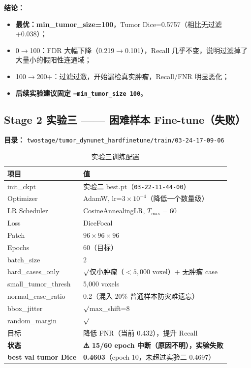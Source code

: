\documentclass{article}
\begin{document}
	\noindent\textbf{结论：}
	\begin{itemize}
		\item \textbf{最优：min\_tumor\_size=100}，Tumor Dice=0.5757（相比无过滤 +0.038）；
		\item 0$\to$100：FDR 大幅下降（0.219$\to$0.101），Recall 几乎不变，说明过滤掉了大量小的假阳性连通域；
		\item 100$\to$200+：过滤过激，开始漏检真实肿瘤，Recall/FNR 明显恶化；
		\item \textbf{后续实验建议固定 \texttt{--min\_tumor\_size 100}}。
	\end{itemize}

	\subsection{Stage 2 实验三 —— 困难样本 Fine-tune（失败）}

	\noindent\textbf{目录：} \texttt{twostage/tumor\_dynunet\_hardfinetune/train/03-24-17-09-06}

	\begin{table}[H]
		\centering
		\caption{实验三训练配置}
		\begin{tabular}{ll}
			\hline
			\textbf{项目} & \textbf{值} \\
			\hline
			init\_ckpt           & 实验二 best.pt（\texttt{03-22-11-44-00}） \\
			Optimizer            & AdamW, lr=$3\times10^{-4}$（降低一个数量级） \\
			LR Scheduler         & CosineAnnealingLR, $T_{\max}=60$ \\
			Loss                 & DiceFocal \\
			Patch                & $96\times96\times96$ \\
			Epochs               & 60（目标） \\
			batch\_size          & 2 \\
			hard\_cases\_only    & $\surd$\quad 仅小肿瘤（$<5{,}000$ voxel）+ 无肿瘤 case \\
			small\_tumor\_thresh & 5{,}000 voxels \\
			normal\_case\_ratio  & 0.2（混入 20\% 普通样本防灾难遗忘） \\
			bbox\_jitter         & $\surd$\quad max\_shift=8 \\
			random\_margin       & $\surd$\quad [8, 20] \\
			目标                 & 降低 FNR（当前 0.432），提升 Recall \\
			\hline
			\textbf{状态} & \textbf{⚠ 15/60 epoch 中断（原因不明），实验失败} \\
			\textbf{best val tumor Dice} & \textbf{0.4603}（epoch 10，未超过实验二 0.4697） \\
			\hline
		\end{tabular}
	\end{table}
\end{document}
